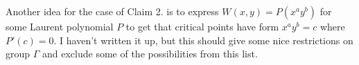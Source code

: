 \documentclass[a4paper]{article}
\begin{document}
Another idea for the case of Claim 2. is to express $W(x,y) = P(x^a y^b)$ for some Laurent polynomial $P$ to get that critical points have form $x^a y^b = c$ where $P'(c) = 0$. I haven't written it up, but this should give some nice restrictions on group $\Gamma$ and exclude some of the possibilities from this list.
\end{document}
